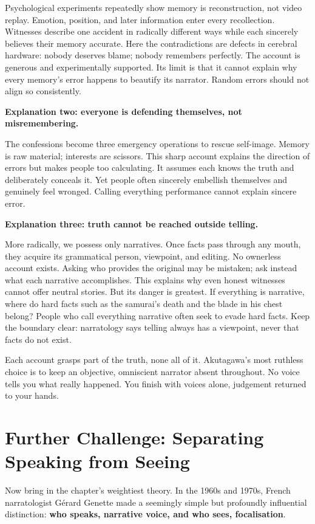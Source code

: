 Psychological experiments repeatedly show memory is reconstruction, not video replay. Emotion, position, and later information enter every recollection. Witnesses describe one accident in radically different ways while each sincerely believes their memory accurate. Here the contradictions are defects in cerebral hardware: nobody deserves blame; nobody remembers perfectly. The account is generous and experimentally supported. Its limit is that it cannot explain why every memory's error happens to beautify its narrator. Random errors should not align so consistently.

\textbf{Explanation two: everyone is defending themselves, not misremembering.}

The confessions become three emergency operations to rescue self-image. Memory is raw material; interests are scissors. This sharp account explains the direction of errors but makes people too calculating. It assumes each knows the truth and deliberately conceals it. Yet people often sincerely embellish themselves and genuinely feel wronged. Calling everything performance cannot explain sincere error.

\textbf{Explanation three: truth cannot be reached outside telling.}

More radically, we possess only narratives. Once facts pass through any mouth, they acquire its grammatical person, viewpoint, and editing. No ownerless account exists. Asking who provides the original may be mistaken; ask instead what each narrative accomplishes. This explains why even honest witnesses cannot offer neutral stories. But its danger is greatest. If everything is narrative, where do hard facts such as the samurai's death and the blade in his chest belong? People who call everything narrative often seek to evade hard facts. Keep the boundary clear: narratology says telling always has a viewpoint, never that facts do not exist.

Each account grasps part of the truth, none all of it. Akutagawa's most ruthless choice is to keep an objective, omniscient narrator absent throughout. No voice tells you what really happened. You finish with voices alone, judgement returned to your hands.

\section[Further Challenge: Separate Voice and Vision]{Further Challenge: Separating Speaking from Seeing}
Now bring in the chapter's weightiest theory. In the 1960s and 1970s, French narratologist Gérard Genette made a seemingly simple but profoundly influential distinction: \textbf{who speaks, narrative voice, and who sees, focalisation}.

